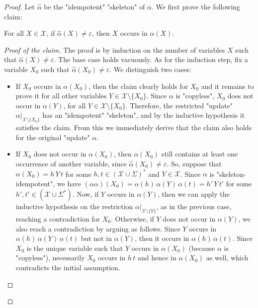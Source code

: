 \documentclass{theoretics}
\newcommand{\var}{\mathcal{X}}
\begin{document}
\begin{proof}
    Let $\hat{\alpha}$ be the "idempotent" "skeleton" of $\alpha$. 
    We first prove the following claim:
    
    \begin{claim*}
    For all $X\in\var$, if $\hat\alpha(X) \neq \varepsilon$,
    then $X$ occurs in $\alpha(X)$.
    \end{claim*}


\begin{proof}[Proof of the claim]
The proof is by induction on the number of variables $X$
such that $\hat\alpha(X) \neq \varepsilon$.
The base case holds vacuously.
As for the induction step, fix a variable $X_0$ such that
$\hat\alpha(X_0) \neq \varepsilon$.
We distinguish two cases:
\begin{itemize}
\item If $X_0$ occurs in $\alpha(X_0)$, then the claim clearly holds for $X_0$
      and it remains to prove it for all other variables $Y\in\var\setminus\{X_0\}$.
      Since $\alpha$ is "copyless",
      $X_0$ does not occur in $\alpha(Y)$, for all $Y\in\var\setminus\{X_0\}$.
      Therefore, the restricted "update" $\alpha|_{\var\setminus\{X_0\}}$ 
      has an "idempotent" "skeleton", and by the inductive hypothesis 
      it satisfies the claim.
      From this we immediately derive that the claim also holds for the 
      original "update" $\alpha$.
\item If $X_0$ does not occur in $\alpha(X_0)$, then 
      $\alpha(X_0)$ still contains at least one occurrence of another variable,
      since $\hat\alpha(X_0) \neq \varepsilon$.
      So, suppose that $\alpha(X_0) = h\, Y \, t$ 
      for some $h,t\in (\var\cup\Sigma)^*$ and $Y\in\var$. 
      Since $\alpha$ is "skeleton-idempotent", we have
      $(\alpha\alpha)(X_0) = \alpha(h) \, \alpha(Y) \, \alpha(t) = h'\, Y\, t'$
      for some $h',t'\in (\var\cup\Sigma^*)$. 
      Now, if $Y$ occurs in $\alpha(Y)$, then we can
      apply the inductive hypothesis on the restriction
      $\alpha|_{\var\setminus\{Y\}}$, as in the previous case,
      reaching a contradiction for $X_0$.
      Otherwise, if $Y$ does not occur in $\alpha(Y)$, we also reach
      a contradiction by arguing as follows.
      Since $Y$ occurs in $\alpha(h) \, \alpha(Y) \, \alpha(t)$
      but not in $\alpha(Y)$, then it occurs in $\alpha(h)\,\alpha(t)$. 
      Since $X_0$ is the unique variable such that $Y$ occurs in $\alpha(X_0)$ 
      (because $\alpha$ is "copyless"), necessarily $X_0$ occurs in $h\, t$ 
      and hence in $\alpha(X_0)$ as well, which contradicts the initial 
      assumption. 
      \qedhere
\end{itemize}
\end{proof}
   

\end{proof}
\end{document}
